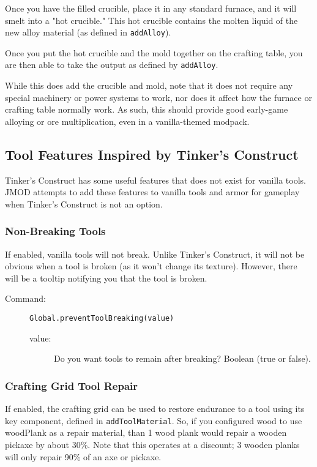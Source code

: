\documentclass[letterpaper,titlepage,12pt]{article}
\begin{document}
Once you have the filled crucible, place it in any standard furnace, and it will smelt into a "hot crucible."  This hot crucible contains the molten liquid of the new alloy material (as defined in \texttt{addAlloy}).

Once you put the hot crucible and the mold together on the crafting table, you are then able to take the output as defined by \texttt{addAlloy}.

While this does add the crucible and mold, note that it does not require any special machinery or power systems to work, nor does it affect how the furnace or crafting table normally work.  As such, this should provide good early-game alloying or ore multiplication, even in a vanilla-themed modpack.

\subsection{Tool Features Inspired by Tinker's Construct}

Tinker's Construct has some useful features that does not exist for vanilla tools.  JMOD attempts to add these features to vanilla tools and armor for gameplay when Tinker's Construct is not an option.

\subsubsection{Non-Breaking Tools}

If enabled, vanilla tools will not break.  Unlike Tinker's Construct, it will not be obvious when a tool is broken (as it won't change its texture).  However, there will be a tooltip notifying you that the tool is broken.

\begin{description}
\item[Command:] \texttt{Global.preventToolBreaking(value)}
\begin{description}
\item [value:] Do you want tools to remain after breaking?  Boolean (true or false).
\end{description}
\end{description}

\subsubsection{Crafting Grid Tool Repair}

If enabled, the crafting grid can be used to restore endurance to a tool using its key component, defined in \texttt{addToolMaterial}.  So, if you configured wood to use woodPlank as a repair material, than 1 wood plank would repair a wooden pickaxe by about 30\%.  Note that this operates at a discount; 3 wooden planks will only repair 90\% of an axe or pickaxe.
\end{document}
